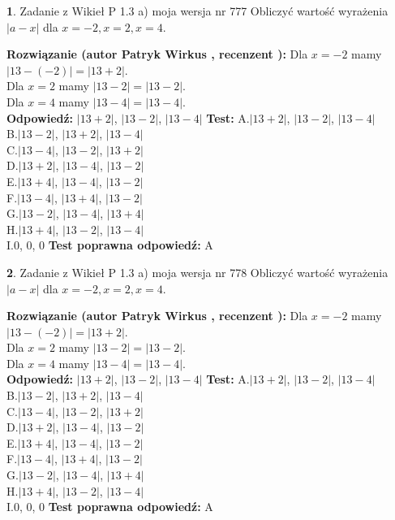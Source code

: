 \documentclass[12pt, a4paper]{article}
\theoremstyle{definition} %
\newtheorem{zad}{}
\newcommand{\zadStart}[1]{\begin{zad}#1\newline}
\newcommand{\zadStop}{\end{zad}}
\newcommand{\rozwStart}[2]{\noindent \textbf{Rozwiązanie (autor #1 , recenzent #2): }\newline}
\newcommand{\rozwStop}{\newline}
\newcommand{\odpStart}{\noindent \textbf{Odpowiedź:}\newline}
\newcommand{\odpStop}{\newline}
\newcommand{\testStart}{\noindent \textbf{Test:}\newline}
\newcommand{\testStop}{\newline}
\newcommand{\kluczStart}{\noindent \textbf{Test poprawna odpowiedź:}\newline}
\newcommand{\kluczStop}{\newline}
\begin{document}
\zadStart{Zadanie z Wikieł P 1.3 a) moja wersja nr 777}
Obliczyć wartość wyrażenia $|a - x|$ dla $x=-2,x=2,x=4$.
\zadStop
\rozwStart{Patryk Wirkus}{}
Dla $x = -2$ mamy $|13 - (-2)| = |13 + 2|$.\\
Dla $x = 2$ mamy $|13 - 2| = |13 - 2|$.\\
Dla $x = 4$ mamy $|13 - 4| = |13 - 4|$.\\
\rozwStop
\odpStart
$|13 + 2|$, $|13 - 2|$, $|13 - 4|$
\odpStop
\testStart
A.$|13 + 2|$, $|13 - 2|$, $|13 - 4|$\\
B.$|13 - 2|$, $|13 + 2|$, $|13 - 4|$\\
C.$|13 - 4|$, $|13 - 2|$, $|13 + 2|$\\
D.$|13 + 2|$, $|13 - 4|$, $|13 - 2|$\\
E.$|13 + 4|$, $|13 - 4|$, $|13 - 2|$\\
F.$|13 - 4|$, $|13 + 4|$, $|13 - 2|$\\
G.$|13 - 2|$, $|13 - 4|$, $|13 + 4|$\\
H.$|13 + 4|$, $|13 - 2|$, $|13 - 4|$\\
I.$0$, $0$, $0$
\testStop
\kluczStart
A
\kluczStop



\zadStart{Zadanie z Wikieł P 1.3 a) moja wersja nr 778}
Obliczyć wartość wyrażenia $|a - x|$ dla $x=-2,x=2,x=4$.
\zadStop
\rozwStart{Patryk Wirkus}{}
Dla $x = -2$ mamy $|13 - (-2)| = |13 + 2|$.\\
Dla $x = 2$ mamy $|13 - 2| = |13 - 2|$.\\
Dla $x = 4$ mamy $|13 - 4| = |13 - 4|$.\\
\rozwStop
\odpStart
$|13 + 2|$, $|13 - 2|$, $|13 - 4|$
\odpStop
\testStart
A.$|13 + 2|$, $|13 - 2|$, $|13 - 4|$\\
B.$|13 - 2|$, $|13 + 2|$, $|13 - 4|$\\
C.$|13 - 4|$, $|13 - 2|$, $|13 + 2|$\\
D.$|13 + 2|$, $|13 - 4|$, $|13 - 2|$\\
E.$|13 + 4|$, $|13 - 4|$, $|13 - 2|$\\
F.$|13 - 4|$, $|13 + 4|$, $|13 - 2|$\\
G.$|13 - 2|$, $|13 - 4|$, $|13 + 4|$\\
H.$|13 + 4|$, $|13 - 2|$, $|13 - 4|$\\
I.$0$, $0$, $0$
\testStop
\kluczStart
A
\kluczStop
\end{document}
